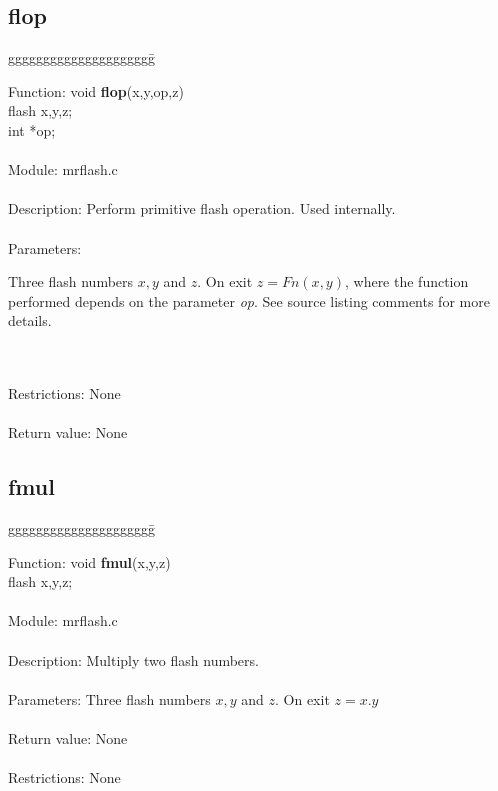 \subsection{flop}

\begin{tabbing}
ggggggggggggggggggggg\= \kill

      Function:      \>void {\bf flop}(x,y,op,z) \\
                     \>flash x,y,z; \\
                     \>int *op; \\
      \ \\
      Module:        \>mrflash.c \\
      \ \\
      Description:   \>Perform primitive flash operation. Used internally. \\
      \ \\
      Parameters:    \>
                     \parbox[t]{3in}
                     {Three flash numbers $x, y$ and $z$. On exit $z=Fn(x,y)$,
                     where the function performed depends on the
                     parameter {\em op}. See source listing comments for more
                     details.} \\
      \ \\
      Restrictions:  \>None \\
      \ \\
      Return value:  \>None \\

\end{tabbing}

\subsection{fmul}

\begin{tabbing}
ggggggggggggggggggggg\= \kill


      Function:      \>void {\bf fmul}(x,y,z) \\
                     \>flash x,y,z; \\
      \ \\
      Module:        \>mrflash.c \\
      \ \\
      Description:   \>Multiply two flash numbers. \\
      \ \\
      Parameters:    \>Three flash numbers $x, y$ and $z$. On exit $z=x.y$ \\
      \ \\
      Return value:  \>None \\
      \ \\
      Restrictions:  \>None \\

\end{tabbing}
\pagebreak
